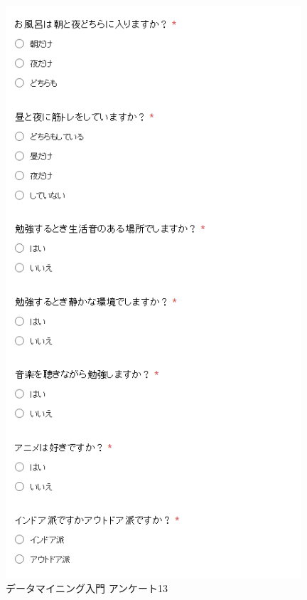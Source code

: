 \begin{figure}[p]
\centering
\includegraphics[width=11cm]{forms13.PNG}
\caption{データマイニング入門 アンケート13}\label{サンプル図}
\end{figure}

